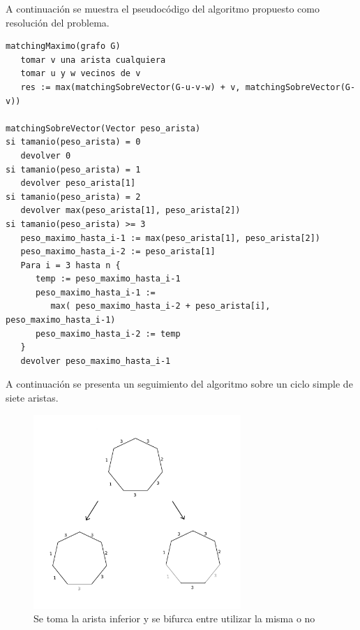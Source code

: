 \documentclass[a4paper, 12pt]{article}
\begin{document}
A continuaci\'on se muestra el pseudoc\'odigo del algoritmo propuesto como resoluci\'on del problema.


\begin{verbatim}
matchingMaximo(grafo G)
   tomar v una arista cualquiera
   tomar u y w vecinos de v
   res := max(matchingSobreVector(G-u-v-w) + v, matchingSobreVector(G-v))

matchingSobreVector(Vector peso_arista)
si tamanio(peso_arista) = 0
   devolver 0
si tamanio(peso_arista) = 1
   devolver peso_arista[1]
si tamanio(peso_arista) = 2
   devolver max(peso_arista[1], peso_arista[2])
si tamanio(peso_arista) >= 3
   peso_maximo_hasta_i-1 := max(peso_arista[1], peso_arista[2]) 
   peso_maximo_hasta_i-2 := peso_arista[1]
   Para i = 3 hasta n {
      temp := peso_maximo_hasta_i-1
      peso_maximo_hasta_i-1 := 
         max( peso_maximo_hasta_i-2 + peso_arista[i], peso_maximo_hasta_i-1)
      peso_maximo_hasta_i-2 := temp
   }
   devolver peso_maximo_hasta_i-1

\end{verbatim}

A continuaci\'on se presenta un seguimiento del algoritmo sobre un ciclo simple de siete aristas.

\begin{figure}[H]
\begin{center}
\includegraphics[width=0.7\textwidth]{imagenes/paso1y2.png}
\caption{Se toma la arista inferior y se bifurca entre utilizar la misma o no}
\end{center}
\end{figure}
\end{document}
